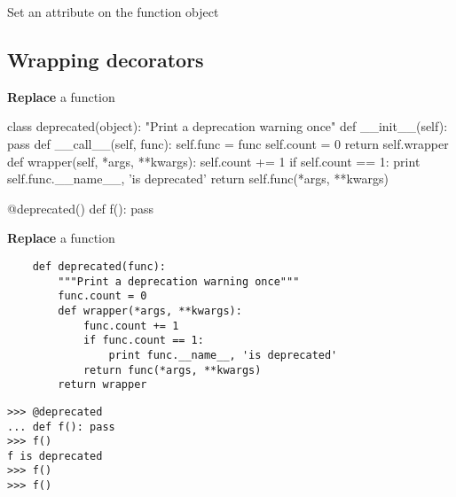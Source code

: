 \documentclass{beamer}
\begin{document}
\begin{frame}[fragile]{Set an attribute on the function object}
\end{frame}

\subsection{Wrapping decorators}

\begin{frame}[fragile]{\textbf{Replace} a function}
  \begin{pycode}
    class deprecated(object):
        "Print a deprecation warning once"
        def __init__(self):
            pass
        def __call__(self, func):
            self.func = func
            self.count = 0
            return self.wrapper
        def wrapper(self, *args, **kwargs):
            self.count += 1
            if self.count == 1:
                print self.func.__name__, 'is deprecated'
            return self.func(*args, **kwargs)
  \end{pycode}
  \pause
  \begin{pycode}
    @deprecated()
    def f(): pass
  \end{pycode}
\end{frame}

\begin{frame}[fragile]{\textbf{Replace} a function}
  \begin{verbatim}
    def deprecated(func):
        """Print a deprecation warning once"""
        func.count = 0
        def wrapper(*args, **kwargs):
            func.count += 1
            if func.count == 1:
                print func.__name__, 'is deprecated'
            return func(*args, **kwargs)
        return wrapper
  \end{verbatim}

  \pause
  \begin{verbatim}
>>> @deprecated
... def f(): pass
>>> f()
f is deprecated
>>> f()
>>> f()
  \end{verbatim}
\end{frame}
\end{document}
